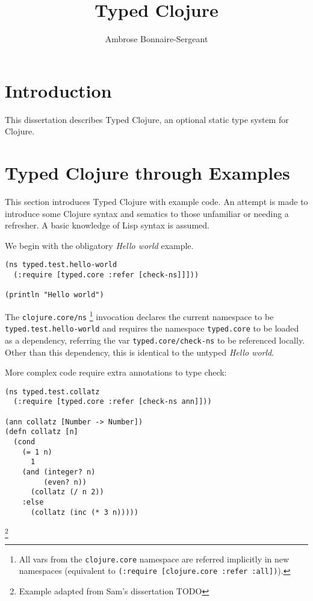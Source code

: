\documentclass{cshonours}
\title{Typed Clojure}
\author{Ambrose Bonnaire-Sergeant}
\begin{document}
\maketitle


\chapter{Introduction}

This dissertation describes Typed Clojure, an optional static type system for Clojure.


\chapter{Typed Clojure through Examples}

This section introduces Typed Clojure with example code. An attempt is
made to introduce some Clojure syntax and sematics to those unfamiliar or needing a refresher.
A basic knowledge of Lisp syntax is assumed.

We begin with the obligatory \emph{Hello world} example.

\begin{lstlisting}[caption=Hello world]
(ns typed.test.hello-world
  (:require [typed.core :refer [check-ns]]]))

(println "Hello world")
\end{lstlisting}

The \lstinline|clojure.core/ns|
\footnote{All vars from the \lstinline|clojure.core| namespace are referred implicitly in new namespaces (equivalent to \lstinline|(:require [clojure.core :refer :all])|).}
invocation declares the current namespace to be \lstinline|typed.test.hello-world|
and requires the namespace \lstinline|typed.core| to be loaded as a dependency, referring the var
\lstinline|typed.core/check-ns| to be referenced locally. Other than this
dependency, this is identical to the untyped \emph{Hello world}.

More complex code require extra annotations to type check:

\begin{lstlisting}
(ns typed.test.collatz
  (:require [typed.core :refer [check-ns ann]]))

(ann collatz [Number -> Number])
(defn collatz [n]
  (cond
    (= 1 n) 
      1
    (and (integer? n) 
         (even? n)) 
      (collatz (/ n 2))
    :else 
      (collatz (inc (* 3 n)))))
\end{lstlisting}
\footnote{Example adapted from Sam's dissertation TODO}
\end{document}
